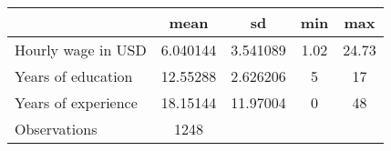 {
\def\sym#1{\ifmmode^{#1}\else\(^{#1}\)\fi}
\begin{tabular}{l*{1}{cccc}}
\hline\hline
                    &        mean&          sd&         min&         max\\
\hline
Hourly wage in USD  &    6.040144&    3.541089&        1.02&       24.73\\
Years of education  &    12.55288&    2.626206&           5&          17\\
Years of experience &    18.15144&    11.97004&           0&          48\\
\hline
Observations        &        1248&            &            &            \\
\hline\hline
\end{tabular}
}
